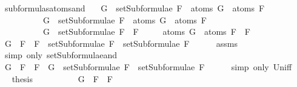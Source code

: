 \begin{isabellebody}
\ subformulas{\isacharunderscore}atoms{\isacharunderscore}and{\isacharcolon}\isanewline
\ \ \ {\isachardoublequoteopen}G\ {\isasymin}\ setSubformulae\ F{}\ {\isasymLongrightarrow}\ atoms\ G\ {\isasymsubseteq}\ atoms\ F{}{\isachardoublequoteclose}\isanewline
\ \ \ \ \ \ \ \ \ \ {\isachardoublequoteopen}G\ {\isasymin}\ setSubformulae\ F{}\ {\isasymLongrightarrow}\ atoms\ G\ {\isasymsubseteq}\ atoms\ F{}{\isachardoublequoteclose}\isanewline
\ \ \ \ \ \ \ \ \ \ {\isachardoublequoteopen}G\ {\isasymin}\ setSubformulae\ {\isacharparenleft}F{}\ \isactrlbold {\isasymand}\ F{}{\isacharparenright}{\isachardoublequoteclose}\isanewline
\ \ \ \ \ {\isachardoublequoteopen}atoms\ G\ {\isasymsubseteq}\ atoms\ {\isacharparenleft}F{}\ \isactrlbold {\isasymand}\ F{}{\isacharparenright}{\isachardoublequoteclose}\isanewline
%
\isadelimproof
%
\endisadelimproof
%
\isatagproof
{}\isamarkupfalse%
\ {\isacharminus}\isanewline
\ \ \isamarkupfalse%
\ {\isachardoublequoteopen}G\ {\isasymin}\ {\isacharbraceleft}F{}\ \isactrlbold {\isasymand}\ F{}{\isacharbraceright}\ {\isasymunion}\ {\isacharparenleft}setSubformulae\ F{}\ {\isasymunion}\ setSubformulae\ F{}{\isacharparenright}{\isachardoublequoteclose}\isanewline
\ \ \ \ \isamarkupfalse%
\ assms{\isacharparenleft}{}{\isacharparenright}\ \isanewline
\ \ \ \ \isamarkupfalse%
\ {\isacharparenleft}simp\ only{\isacharcolon}\ setSubformulae{\isacharunderscore}and{\isacharparenright}\isanewline
\ \ \isamarkupfalse%
\ \isamarkupfalse%
\ {\isachardoublequoteopen}G\ {\isasymin}\ {\isacharbraceleft}F{}\ \isactrlbold {\isasymand}\ F{}{\isacharbraceright}\ {\isasymor}\ G\ {\isasymin}\ setSubformulae\ F{}\ {\isasymunion}\ setSubformulae\ F{}{\isachardoublequoteclose}\isanewline
\ \ \ \ \isamarkupfalse%
\ {\isacharparenleft}simp\ only{\isacharcolon}\ Un{\isacharunderscore}iff{\isacharparenright}\isanewline
\ \ \isamarkupfalse%
\ \isamarkupfalse%
\ {\isacharquery}thesis\isanewline
\ \ \isamarkupfalse%
\ \isanewline
\ \ \ \ \isamarkupfalse%
\ {\isachardoublequoteopen}G\ {\isasymin}\ {\isacharbraceleft}F{}\ \isactrlbold {\isasymand}\ F{}{\isacharbraceright}{\isachardoublequoteclose}\isanewline
\ \ \ \ \isamarkupfalse%

\end{isabellebody}
